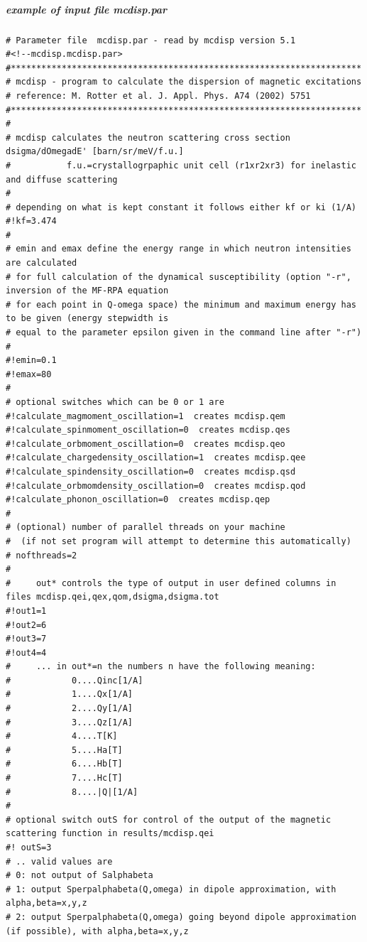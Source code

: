 \subparagraph{example of input file {\prg mcdisp.par}}

{\footnotesize
\begin{verbatim}
# Parameter file  mcdisp.par - read by mcdisp version 5.1
#<!--mcdisp.mcdisp.par>
#*********************************************************************
# mcdisp - program to calculate the dispersion of magnetic excitations
# reference: M. Rotter et al. J. Appl. Phys. A74 (2002) 5751
#*********************************************************************
#
# mcdisp calculates the neutron scattering cross section dsigma/dOmegadE' [barn/sr/meV/f.u.]
#           f.u.=crystallogrpaphic unit cell (r1xr2xr3) for inelastic and diffuse scattering
#
# depending on what is kept constant it follows either kf or ki (1/A)
#!kf=3.474
# 
# emin and emax define the energy range in which neutron intensities are calculated
# for full calculation of the dynamical susceptibility (option "-r", inversion of the MF-RPA equation 
# for each point in Q-omega space) the minimum and maximum energy has to be given (energy stepwidth is 
# equal to the parameter epsilon given in the command line after "-r")
#
#!emin=0.1
#!emax=80
#
# optional switches which can be 0 or 1 are
#!calculate_magmoment_oscillation=1  creates mcdisp.qem
#!calculate_spinmoment_oscillation=0  creates mcdisp.qes
#!calculate_orbmoment_oscillation=0  creates mcdisp.qeo
#!calculate_chargedensity_oscillation=1  creates mcdisp.qee
#!calculate_spindensity_oscillation=0  creates mcdisp.qsd
#!calculate_orbmomdensity_oscillation=0  creates mcdisp.qod
#!calculate_phonon_oscillation=0  creates mcdisp.qep
#
# (optional) number of parallel threads on your machine
#  (if not set program will attempt to determine this automatically)
# nofthreads=2
#
#     out* controls the type of output in user defined columns in files mcdisp.qei,qex,qom,dsigma,dsigma.tot
#!out1=1 
#!out2=6 
#!out3=7 
#!out4=4 
#     ... in out*=n the numbers n have the following meaning:
#            0....Qinc[1/A] 
#            1....Qx[1/A]   
#            2....Qy[1/A]   
#            3....Qz[1/A]   
#            4....T[K]      
#            5....Ha[T]     
#            6....Hb[T]     
#            7....Hc[T]     
#            8....|Q|[1/A]  
#
# optional switch outS for control of the output of the magnetic scattering function in results/mcdisp.qei
#! outS=3
# .. valid values are
# 0: not output of Salphabeta
# 1: output Sperpalphabeta(Q,omega) in dipole approximation, with alpha,beta=x,y,z
# 2: output Sperpalphabeta(Q,omega) going beyond dipole approximation (if possible), with alpha,beta=x,y,z

\end{verbatim}}
